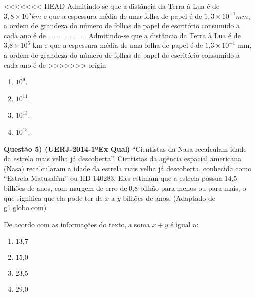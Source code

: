 \textless{}\textless{}\textless{}\textless{}\textless{}\textless{}\textless{} HEAD
Admitindo-se que a distância da Terra à Lua é de \(3,8 ×10^5km\) e que a espessura média de uma folha de papel é de \(1,3 × 10^{-1}mm\), a ordem de grandeza do número de folhas de papel de escritório consumido a cada ano é de
=======
Admitindo-se que a distância da Terra à Lua é de \(3\text{,}8 \times 10^5\) km e que a espessura média de uma folha de papel é de \(1\text{,}3 \times 10^{-1}\) mm, a ordem de grandeza do número de folhas de papel de escritório consumido a cada ano é de
\textgreater{}\textgreater{}\textgreater{}\textgreater{}\textgreater{}\textgreater{}\textgreater{} origin
\begin{enumerate}
\item {} 
\(10^9\).

\item {} 
\(10^{11}\).

\item {} 
\(10^{13}\).

\item {} 
\(10^{15}\).

\end{enumerate}

\textbf{Questão 5) (UERJ-2014-1ºEx Qual)} “Cientistas da Nasa recalculam idade da estrela mais velha já descoberta”. Cientistas da agência espacial americana (Nasa) recalcularam a idade da estrela mais velha já descoberta, conhecida como “Estrela Matusalém” ou HD \(140283\). Eles estimam que a estrela possua \(14\text{,}5\) bilhões de anos, com margem de erro de \(0\text{,}8\) bilhão para menos ou para mais, o que significa que ela pode ter de \(x\) a \(y\) bilhões de anos. (Adaptado de g1.globo.com)

De acordo com as informações do texto, a soma \(x + y\) é igual a:
\begin{enumerate}
\item {} 
\(13\text{,}7\)

\item {} 
\(15\text{,}0\)

\item {} 
\(23\text{,}5\)

\item {} 
\(29\text{,}0\)

\end{enumerate}

